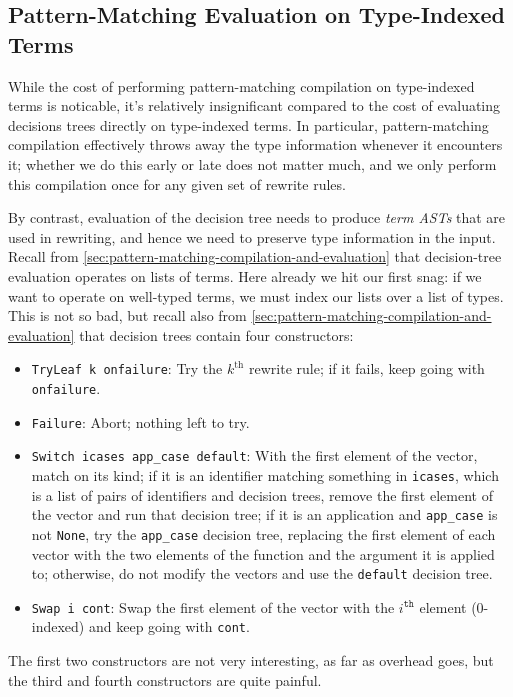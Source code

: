 \subsection{Pattern-Matching Evaluation on Type-Indexed Terms}\label{sec:rewriting-more:AST:type-indexed-pattern-matching}
While the cost of performing pattern-matching compilation on type-indexed terms is noticable, it's relatively insignificant compared to the cost of evaluating decisions trees directly on type-indexed terms.
In particular, pattern-matching compilation effectively throws away the type information whenever it encounters it; whether we do this early or late does not matter much, and we only perform this compilation once for any given set of rewrite rules.

By contrast, evaluation of the decision tree needs to produce \emph{term ASTs} that are used in rewriting, and hence we need to preserve type information in the input.
Recall from \autoref{sec:pattern-matching-compilation-and-evaluation} that decision-tree evaluation operates on lists of terms.
Here already we hit our first snag: if we want to operate on well-typed terms, we must index our lists over a list of types.
This is not so bad, but recall also from \autoref{sec:pattern-matching-compilation-and-evaluation} that decision trees contain four constructors:
\begin{itemize}
  \item \texttt{TryLeaf k onfailure}: Try the $k^\text{th}$ rewrite rule; if it fails, keep going with \texttt{onfailure}.
  \item \texttt{Failure}: Abort; nothing left to try.
  \item \texttt{Switch icases app\_case default}:
    With the first element of the vector, match on its kind; if it is an identifier matching something in \texttt{icases}, which is a list of pairs of identifiers and decision trees, remove the first element of the vector and run that decision tree; if it is an application and \texttt{app\_case} is not \texttt{None}, try the \texttt{app\_case} decision tree, replacing the first element of each vector with the two elements of the function and the argument it is applied to; otherwise, do not modify the vectors and use the \texttt{default} decision tree.
  \item \texttt{Swap i cont}: Swap the first element of the vector with the $i^\texttt{th}$ element (0-indexed) and keep going with \texttt{cont}.
\end{itemize}
The first two constructors are not very interesting, as far as overhead goes, but the third and fourth constructors are quite painful.

